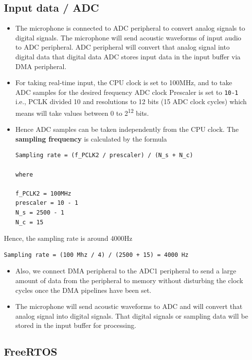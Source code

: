 \documentclass[11pt]{article}
\begin{document}
\subsection{Input data / ADC}
\label{sec:orgfc855b2}

\begin{itemize}
\item The microphone is connected to ADC peripheral to convert analog signals to digital signals. The microphone will send acoustic waveforms of input audio to ADC peripheral. ADC peripheral will convert that analog signal into digital data that digital data ADC stores input data in the input buffer via DMA peripheral.
\item For taking real-time input, the CPU clock is set to 100MHz, and to take ADC samples for the desired frequency ADC clock Prescaler is set to \texttt{10-1} i.e., PCLK divided 10 and resolutions to 12 bits (15 ADC clock cycles) which means will take values between 0 to 2\textsuperscript{12} bits.
\item Hence ADC samples can be taken independently from the CPU clock. The \textbf{sampling frequency} is calculated by the formula

\begin{verbatim}
Sampling rate = (f_PCLK2 / prescaler) / (N_s + N_c)

where

f_PCLK2 = 100MHz
prescaler = 10 - 1
N_s = 2500 - 1
N_c = 15

\end{verbatim}
\end{itemize}

Hence, the sampling rate is around 4000Hz

\begin{verbatim}
Sampling rate = (100 Mhz / 4) / (2500 + 15) = 4000 Hz
\end{verbatim}

\begin{itemize}
\item Also, we connect DMA peripheral to the ADC1 peripheral to send a large amount of data from the peripheral to memory without disturbing the clock cycles once the DMA pipelines have been set.
\item The microphone will send acoustic waveforms to ADC and will convert that analog signal into digital signals. That digital signals or sampling data will be stored in the input buffer for processing.
\end{itemize}

\subsection{FreeRTOS}
\label{sec:org01fb013}
\end{document}
